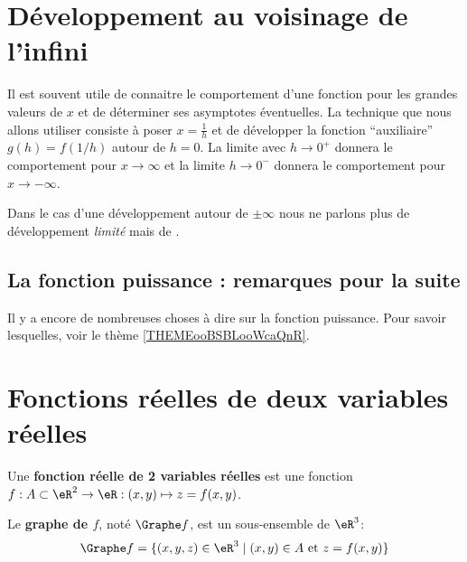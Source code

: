 \section{Développement au voisinage de l'infini}

Il est souvent utile de connaitre le comportement d'une fonction pour les grandes valeurs de \( x\) et de déterminer ses asymptotes éventuelles. La technique que nous allons utiliser consiste à poser \( x=\frac{1}{ h }\) et de développer la fonction ``auxiliaire'' \( g(h) = f(1/h)\) autour de \( h=0\). La limite avec \( h\to 0^+\) donnera le comportement pour \( x\to \infty\) et la limite \( h\to 0^-\) donnera le comportement pour \( x\to -\infty\).

Dans le cas d'une développement autour de \( \pm\infty\) nous ne parlons plus de développement \emph{limité} mais de .

\subsection{La fonction puissance : remarques pour la suite}

Il y a encore de nombreuses choses à dire sur la fonction puissance. Pour savoir lesquelles, voir le thème \ref{THEMEooBSBLooWcaQnR}.

\section{Fonctions réelles de deux variables réelles}

Une \textbf{fonction réelle de 2 variables réelles} est une fonction \( f : A \subset \eR^2 \to \eR : (x,y) \mapsto z = f(x,y)\).

Le \textbf{graphe de \( f\)}, noté \( \Graphe f\), est un sous-ensemble de \( \eR^3\):\[\Graphe f = \{(x,y,z) \in \eR^3 \mid (x,y) \in A \text{ et } z = f(x,y)\}\]

